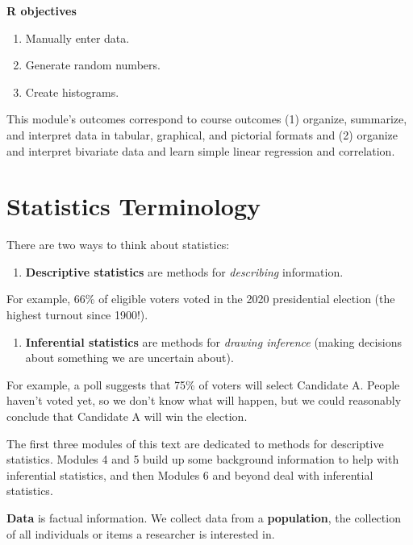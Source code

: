 \documentclass[
]{book}
\providecommand{\tightlist}{%
  \setlength{\itemsep}{0pt}\setlength{\parskip}{0pt}}
\begin{document}
\textbf{R objectives}

\begin{enumerate}
\def\labelenumi{\arabic{enumi}.}
\tightlist
\item
  Manually enter data.
\item
  Generate random numbers.
\item
  Create histograms.
\end{enumerate}

This module's outcomes correspond to course outcomes (1) organize, summarize, and interpret data in tabular, graphical, and pictorial formats and (2) organize and interpret bivariate data and learn simple linear regression and correlation.

\section{Statistics Terminology}\label{statistics-terminology}

There are two ways to think about statistics:

\begin{enumerate}
\def\labelenumi{\arabic{enumi}.}
\tightlist
\item
  \textbf{Descriptive statistics} are methods for \emph{describing} information.
\end{enumerate}

For example, 66\% of eligible voters voted in the 2020 presidential election (the highest turnout since 1900!).

\begin{enumerate}
\def\labelenumi{\arabic{enumi}.}
\setcounter{enumi}{1}
\tightlist
\item
  \textbf{Inferential statistics} are methods for \emph{drawing inference} (making decisions about something we are uncertain about).
\end{enumerate}

For example, a poll suggests that 75\% of voters will select Candidate A. People haven't voted yet, so we don't know what will happen, but we could reasonably conclude that Candidate A will win the election.

The first three modules of this text are dedicated to methods for descriptive statistics. Modules 4 and 5 build up some background information to help with inferential statistics, and then Modules 6 and beyond deal with inferential statistics.

\textbf{Data} is factual information. We collect data from a \textbf{population}, the collection of all individuals or items a researcher is interested in.
\end{document}
